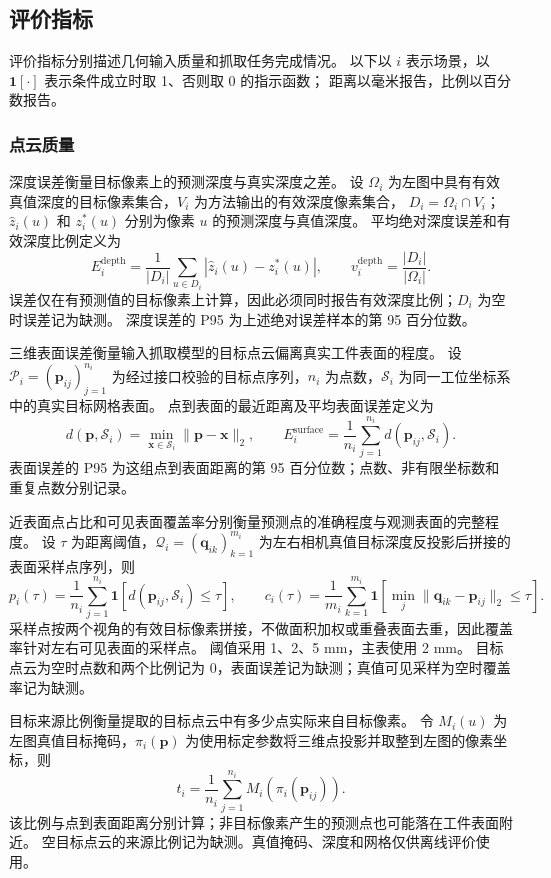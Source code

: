 \documentclass[UTF8,fontset=fandol,a4paper,11pt]{ctexart}
\newcommand{\qyb}[1]{\textcolor{red!75!black}{#1}}
\begin{document}
\subsection{\qyb{评价指标}}

评价指标分别描述几何输入质量和抓取任务完成情况。
以下以 $i$ 表示场景，以 $\mathbf{1}[\cdot]$ 表示条件成立时取 1、否则取 0 的指示函数；
距离以毫米报告，比例以百分数报告。

\subsubsection{点云质量}

深度误差衡量目标像素上的预测深度与真实深度之差。
设 $\Omega_i$ 为左图中具有有效真值深度的目标像素集合，$V_i$ 为方法输出的有效深度像素集合，
$D_i=\Omega_i\cap V_i$；$\hat z_i(u)$ 和 $z_i^*(u)$ 分别为像素 $u$ 的预测深度与真值深度。
平均绝对深度误差和有效深度比例定义为
\[
 E_i^{\mathrm{depth}}=\frac{1}{|D_i|}\sum_{u\in D_i}|\hat z_i(u)-z_i^*(u)|,
 \qquad
 v_i^{\mathrm{depth}}=\frac{|D_i|}{|\Omega_i|}.
\]
误差仅在有预测值的目标像素上计算，因此必须同时报告有效深度比例；$D_i$ 为空时误差记为缺测。
深度误差的 P95 为上述绝对误差样本的第 95 百分位数。

三维表面误差衡量输入抓取模型的目标点云偏离真实工件表面的程度。
设 $\mathcal P_i=(\mathbf p_{ij})_{j=1}^{n_i}$ 为经过接口校验的目标点序列，$n_i$ 为点数，$\mathcal S_i$ 为同一工位坐标系中的真实目标网格表面。
点到表面的最近距离及平均表面误差定义为
\[
 d(\mathbf p,\mathcal S_i)=\min_{\mathbf x\in\mathcal S_i}\|\mathbf p-\mathbf x\|_2,
 \qquad
 E_i^{\mathrm{surface}}=\frac{1}{n_i}\sum_{j=1}^{n_i}d(\mathbf p_{ij},\mathcal S_i).
\]
表面误差的 P95 为这组点到表面距离的第 95 百分位数；点数、非有限坐标数和重复点数分别记录。

近表面点占比和可见表面覆盖率分别衡量预测点的准确程度与观测表面的完整程度。
设 $\tau$ 为距离阈值，$\mathcal Q_i=(\mathbf q_{ik})_{k=1}^{m_i}$ 为左右相机真值目标深度反投影后拼接的表面采样点序列，则
\[
 p_i(\tau)=\frac{1}{n_i}\sum_{j=1}^{n_i}\mathbf{1}\!\left[d(\mathbf p_{ij},\mathcal S_i)\leq\tau\right],
 \qquad
 c_i(\tau)=\frac{1}{m_i}\sum_{k=1}^{m_i}\mathbf{1}\!\left[\min_j\|\mathbf q_{ik}-\mathbf p_{ij}\|_2\leq\tau\right].
\]
采样点按两个视角的有效目标像素拼接，不做面积加权或重叠表面去重，因此覆盖率针对左右可见表面的采样点。
阈值采用 1、2、5 mm，主表使用 2 mm。
目标点云为空时点数和两个比例记为 0，表面误差记为缺测；真值可见采样为空时覆盖率记为缺测。

目标来源比例衡量提取的目标点云中有多少点实际来自目标像素。
令 $M_i(u)$ 为左图真值目标掩码，$\pi_i(\mathbf p)$ 为使用标定参数将三维点投影并取整到左图的像素坐标，则
\[
 t_i=\frac{1}{n_i}\sum_{j=1}^{n_i}M_i\!\left(\pi_i(\mathbf p_{ij})\right).
\]
该比例与点到表面距离分别计算；非目标像素产生的预测点也可能落在工件表面附近。
空目标点云的来源比例记为缺测。真值掩码、深度和网格仅供离线评价使用。
\end{document}
